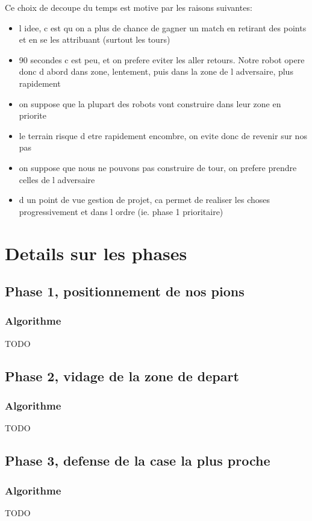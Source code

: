 \documentclass[a4paper, 11pt]{article}
\begin{document}
Ce choix de decoupe du temps est motive par les raisons suivantes:
\begin{itemize}
   \item l idee, c est qu on a plus de chance de gagner un match en retirant des points
     et en se les attribuant (surtout les tours) 
   \item 90 secondes c est peu, et on prefere eviter les aller retours. Notre robot
     opere donc d abord dans zone, lentement, puis dans la zone de l adversaire,
     plus rapidement
   \item on suppose que la plupart des robots vont construire dans leur zone
     en priorite
   \item le terrain risque d etre rapidement encombre, on evite donc de revenir sur
     nos pas
   \item on suppose que nous ne pouvons pas construire de tour, on prefere prendre
     celles de l adversaire
   \item d un point de vue gestion de projet, ca permet de realiser les choses
     progressivement et dans l ordre (ie. phase 1 prioritaire)
\end{itemize}


\newpage
\section{Details sur les phases}
\subsection{Phase 1, positionnement de nos pions}
\subsubsection{Algorithme}
TODO

\subsection{Phase 2, vidage de la zone de depart}
\subsubsection{Algorithme}
TODO

\subsection{Phase 3, defense de la case la plus proche}
\subsubsection{Algorithme}
TODO
\end{document}
